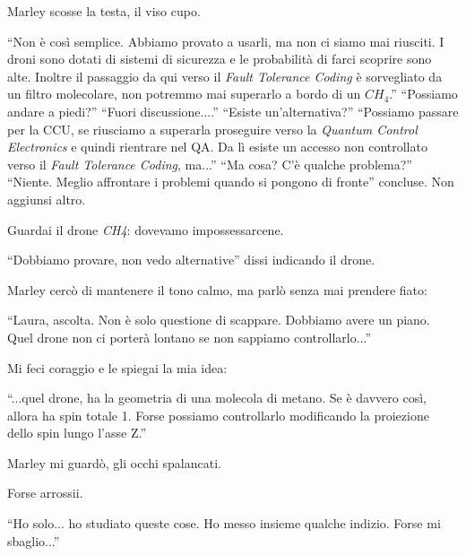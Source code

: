 Marley scosse la testa, il viso cupo.

\begin{dialogue}
 \enquote{Non è così semplice. Abbiamo provato a usarli, ma non ci siamo mai riusciti. I droni sono dotati di sistemi di sicurezza e le probabilità di farci scoprire sono alte. Inoltre il passaggio da qui verso il \textit{Fault Tolerance Coding} è sorvegliato da un filtro molecolare, non potremmo mai superarlo a bordo di un $CH_4$.}
 \enquote{Possiamo andare a piedi?}
 \enquote{Fuori discussione....}
 \enquote{Esiste un'alternativa?}
 \enquote{Possiamo passare per la CCU, se riusciamo a superarla proseguire verso la \textit{Quantum Control Electronics}  e quindi rientrare nel QA. Da lì esiste un accesso non controllato verso il \textit{Fault Tolerance Coding}, ma...}
 \enquote{Ma cosa? C'è qualche problema?}
 \enquote{Niente. Meglio affrontare i problemi quando si pongono di fronte} concluse. Non aggiunsi altro. 
\end{dialogue}

Guardai il drone \textit{CH4}: dovevamo impossessarcene.

\begin{dialogue}
 \enquote{Dobbiamo provare, non vedo alternative} dissi indicando il drone.
\end{dialogue}
Marley cercò di mantenere il tono calmo, ma parlò senza mai prendere fiato:
\begin{dialogue}
  \enquote{Laura, ascolta. Non è solo questione di scappare. Dobbiamo avere un piano. Quel drone non ci porterà lontano se non sappiamo controllarlo...}
\end{dialogue}





Mi feci coraggio e le spiegai la mia idea:

\begin{dialogue}
 \enquote{...quel drone, ha la geometria di una molecola di metano. Se è davvero così, allora ha spin totale 1. Forse possiamo controllarlo modificando la proiezione dello spin lungo l'asse Z.}
\end{dialogue}

Marley mi guardò, gli occhi spalancati.

Forse arrossii.

\begin{dialogue}
 \enquote{Ho solo... ho studiato queste cose. Ho messo insieme qualche indizio. Forse mi sbaglio...}
\end{dialogue}

